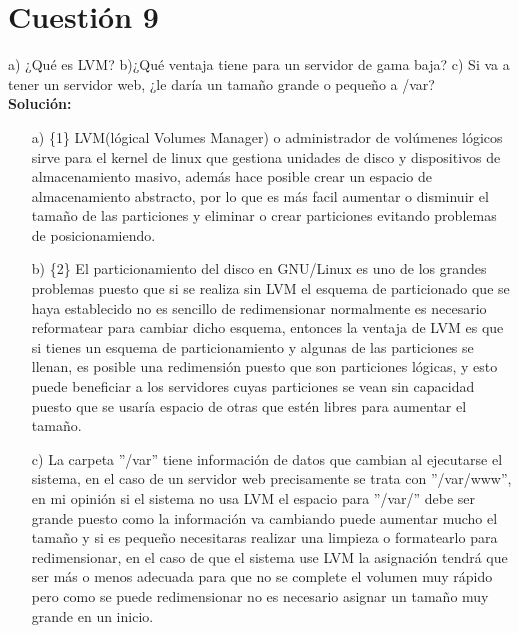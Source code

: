 \documentclass[a4paper, 11pt]{article} %
\begin{document}
\section{Cuestión 9}
a) ¿Qué es LVM? b)¿Qué ventaja tiene para un servidor de gama baja? c) Si va a tener un servidor web, ¿le daría un tamaño grande o pequeño a /var?\\
\textbf{Solución:}\\
\begin{itemize}
\item[a)] \{1\} LVM(lógical Volumes Manager) o administrador de volúmenes lógicos sirve para el kernel de linux que gestiona unidades de disco y dispositivos de almacenamiento masivo, además hace posible crear un espacio de almacenamiento abstracto, por lo que es más facil aumentar o disminuir el tamaño de las particiones y eliminar o crear particiones evitando problemas de posicionamiendo.
\item[b)] \{2\} El particionamiento del disco en GNU/Linux es uno de los grandes problemas puesto que si se realiza sin LVM el esquema de particionado que se haya establecido no es sencillo de redimensionar normalmente es necesario reformatear para cambiar dicho esquema, entonces la ventaja de LVM es que si tienes un esquema de particionamiento y algunas de las particiones se llenan, es posible una redimensión puesto que son particiones lógicas, y esto puede beneficiar a los servidores cuyas particiones se vean sin capacidad puesto que se usaría espacio de otras que estén libres para aumentar el tamaño.
\item[c)] La carpeta ''/var'' tiene información de datos que cambian al ejecutarse el sistema, en el caso de un servidor web precisamente se trata con ''/var/www'', en mi opinión si el sistema no usa LVM el espacio para ''/var/'' debe ser grande puesto como la información va cambiando puede aumentar mucho el tamaño y si es pequeño necesitaras realizar una limpieza o formatearlo para redimensionar, en el caso de que el sistema use LVM la asignación tendrá que ser más o menos adecuada para que no se complete el volumen muy rápido pero como se puede redimensionar no es necesario asignar un tamaño muy grande en un inicio. 
\end{itemize}
\end{document}
